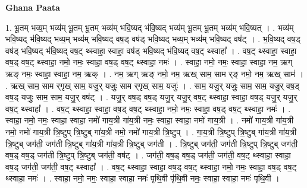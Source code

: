 \documentclass[17pt]{extarticle}
\begin{document}
\textbf{Ghana Paata } \newline

1. भू॒तम् भव्य॒म् भव्य॑म् भू॒तम् भू॒तम् भव्य॑म् भवि॒ष्यद् भ॑वि॒ष्यद् भव्य॑म् भू॒तम् भू॒तम् भव्य॑म् भवि॒ष्यत् । . भव्य॑म् भवि॒ष्यद् भ॑वि॒ष्यद् भव्य॒म् भव्य॑म् भवि॒ष्यद् वष॒ड् वष॑ड् भवि॒ष्यद् भव्य॒म् भव्य॑म् भवि॒ष्यद् वष॑ट् । . भ॒वि॒ष्यद् वष॒ड् वष॑ड् भवि॒ष्यद् भ॑वि॒ष्यद् वष॒ट् थ्स्वाहा॒ स्वाहा॒ वष॑ड् भवि॒ष्यद् भ॑वि॒ष्यद् वष॒ट् थ्स्वाहा᳚ । . वष॒ट् थ्स्वाहा॒ स्वाहा॒ वष॒ड् वष॒ट् थ्स्वाहा॒ नमो॒ नमः॒ स्वाहा॒ वष॒ड् वष॒ट् थ्स्वाहा॒ नमः॑ । . स्वाहा॒ नमो॒ नमः॒ स्वाहा॒ स्वाहा॒ नम॒ ऋग् ऋङ् नमः॒ स्वाहा॒ स्वाहा॒ नम॒ ऋक् । . नम॒ ऋग् ऋङ् नमो॒ नम॒ ऋख् साम॒ साम र्‌ङ् नमो॒ नम॒ ऋख् साम॑ । . ऋख् साम॒ साम र्‌गृख् साम॒ यजु॒र् यजुः॒ साम र्‌गृख् साम॒ यजुः॑ । . साम॒ यजु॒र् यजुः॒ साम॒ साम॒ यजु॒र् वष॒ड् वष॒ड् यजुः॒ साम॒ साम॒ यजु॒र् वष॑ट् । . यजु॒र् वष॒ड् वष॒ड् यजु॒र् यजु॒र् वष॒ट् थ्स्वाहा॒ स्वाहा॒ वष॒ड् यजु॒र् यजु॒र् वष॒ट् थ्स्वाहा᳚ । . वष॒ट् थ्स्वाहा॒ स्वाहा॒ वष॒ड् वष॒ट् थ्स्वाहा॒ नमो॒ नमः॒ स्वाहा॒ वष॒ड् वष॒ट् थ्स्वाहा॒ नमः॑ । . स्वाहा॒ नमो॒ नमः॒ स्वाहा॒ स्वाहा॒ नमो॑ गाय॒त्री गा॑य॒त्री नमः॒ स्वाहा॒ स्वाहा॒ नमो॑ गाय॒त्री । . नमो॑ गाय॒त्री गा॑य॒त्री नमो॒ नमो॑ गाय॒त्री त्रि॒ष्टुप् त्रि॒ष्टुब् गा॑य॒त्री नमो॒ नमो॑ गाय॒त्री त्रि॒ष्टुप् । . गा॒य॒त्री त्रि॒ष्टुप् त्रि॒ष्टुब् गा॑य॒त्री गा॑य॒त्री त्रि॒ष्टुब् जग॑ती॒ जग॑ती त्रि॒ष्टुब् गा॑य॒त्री गा॑य॒त्री त्रि॒ष्टुब् जग॑ती । . त्रि॒ष्टुब् जग॑ती॒ जग॑ती त्रि॒ष्टुप् त्रि॒ष्टुब् जग॑ती॒ वष॒ड् वष॒ड् जग॑ती त्रि॒ष्टुप् त्रि॒ष्टुब् जग॑ती॒ वष॑ट् । . जग॑ती॒ वष॒ड् वष॒ड् जग॑ती॒ जग॑ती॒ वष॒ट् थ्स्वाहा॒ स्वाहा॒ वष॒ड् जग॑ती॒ जग॑ती॒ वष॒ट् थ्स्वाहा᳚ । . वष॒ट् थ्स्वाहा॒ स्वाहा॒ वष॒ड् वष॒ट् थ्स्वाहा॒ नमो॒ नमः॒ स्वाहा॒ वष॒ड् वष॒ट् थ्स्वाहा॒ नमः॑ । . स्वाहा॒ नमो॒ नमः॒ स्वाहा॒ स्वाहा॒ नमः॑ पृथि॒वी पृ॑थि॒वी नमः॒ स्वाहा॒ स्वाहा॒ नमः॑ पृथि॒वी । \newline
\end{document}
